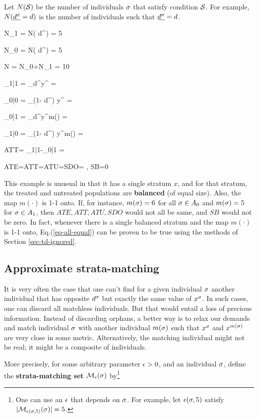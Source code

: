 Let $N({\cal S})$
be the number of individuals $\sigma$
that satisfy condition ${\cal S}$.
For example,
$N(\ul{ d^\s}= d)$
is the number of individuals
such that $\ul{ d^\s}= d$.

\beq
N_1
=
N( d^)
=
5
\eeq

\beq
N_0
=
N( d^)
=
5
\eeq

\beq
N
= N_0+N_1
=
10
\eeq



\beq
\caly_{1|1}
=
\sum_\s  d^\s y^\s
=
\eeq

\beq
\caly_{0|0}
=
\sum_\s (1- d^\s) y^\s
=
\eeq

\beq
\caly_{0|1}
=
\sum_\s  d^\s y^{m(\s)}
=
\eeq

\beq
\caly_{1|0}
=
\sum_\s (1- d^\s) y^{m(\s)}
=
\eeq

\beq
ATT=
\caly_{1|1}-\caly_{0|1}
=
\eeq

\beq
ATE=ATT=ATU=SDO=
\;,\;\; SB=0
\label{eq-all-equal}
\eeq

This example is unusual
in that it has a single
stratum $x$, and for
that stratum,
the treated and
untreated populations
are {\bf balanced} (of equal size).
Also, the map $m(\cdot)$
is 1-1 onto.
If, for instance,
$m(\sigma)=6$ for all $\sigma\in A_0$
and $m(\sigma)=5$ for $\sigma\in A_1$,
then $ATE, ATT, ATU, SDO$
would not all be same, and
$SB$ would not be zero.
In fact, whenever there is a single
balanced stratum and the map $m(\cdot)$
is 1-1 onto, Eq.(\ref{eq-all-equal})
can be proven to be true using
the methods of
Section \ref{sec-td-ignored}.


\subsection{Approximate   strata-matching}

It is very often
the case that
one can't
find for a given
individual $\sigma$
another individual that has
opposite $ d^\sigma$ but
exactly the same value of $x^\sigma$.
In such cases, one can discard all
matchless individuals.
But that would entail a loss
of precious information.
Instead of discarding orphans,
a better way is to
relax our demands and
match individual $\sigma$
with another individual $m(\sigma)$
such that $x^\sigma$
and $x^{m(\sigma)}$ are very
close in some metric.
Alternatively, the matching
individual might
not be real; it might
be a composite
of individuals.

More precisely,
for some arbitrary
parameter $\epsilon>0$,
and an individual $\sigma$,
define
the {\bf  strata-matching set}
${\cal M}_{\epsilon}(\sigma)$ by\footnote{
One can use an $\epsilon$
that depends on $\sigma$.
For example, let $\epsilon(\sigma, 5)$
satisfy
$|{\cal M}_{\epsilon(\sigma, 5)}(\sigma)|=5$.}

